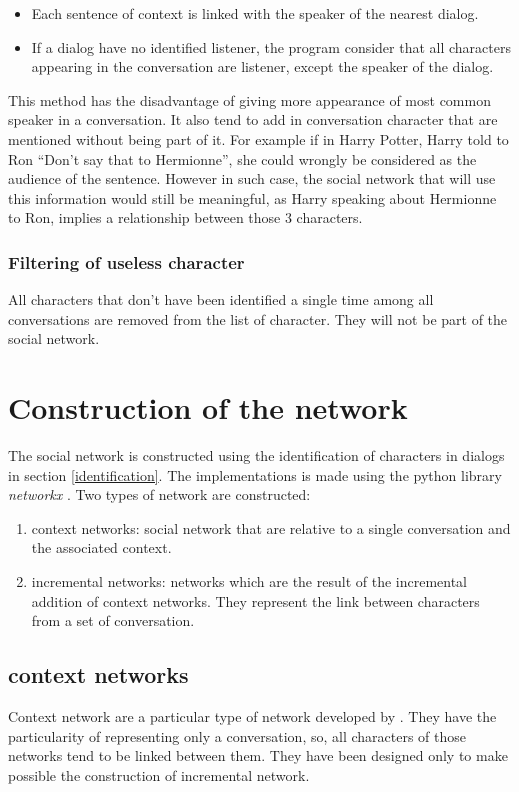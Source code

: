 \documentclass[a4paper, 12pt]{report}
\begin{document}
\begin{itemize}
\item Each sentence of context is linked with the speaker of the nearest dialog.

\item If a dialog have no identified listener, the program consider that all characters appearing in the conversation are listener, except the speaker of the dialog.
\end{itemize}
This method has the disadvantage of giving more appearance of most common speaker in a conversation. It also tend to add in conversation character that are mentioned without being part of it. For example if in Harry Potter, Harry told to Ron ``Don't say that to Hermionne'', she could wrongly be considered as the audience of the sentence. However in such case, the social network that will use this information would still be meaningful, as Harry speaking about Hermionne to Ron, implies a relationship between those 3 characters.


\subsubsection{Filtering of useless character}
All characters that don't have been identified a single time among all conversations are removed from the list of character. They will not be part of the social network.

\section{Construction of the network}
The social network is constructed using the identification of characters in dialogs in section \ref{identification}. The implementations is made using the python library \textit{networkx} \citep{networkx}.
Two types of network are constructed:
\begin{enumerate}
\item context networks: social network that are relative to a single conversation and the associated context. 
\item incremental networks: networks which are the result of the incremental addition of context networks. They represent the link between characters from a set of conversation.
\end{enumerate}
\subsection{context networks}
Context network are a particular type of network developed by \cite{original}. They have the particularity of representing only a conversation, so, all characters of those networks tend to be linked between them. They have been designed only to make possible the construction of incremental network. \\
\end{document}
